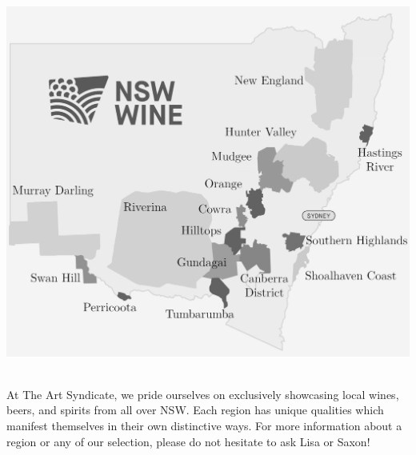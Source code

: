 \documentclass[
    pdflatex,
    fontsize=8pt,
    draft=true,
    twoside
]{article}
\begin{document}
\newpage
\begin{centering}
    \includegraphics[width=\textwidth]{Wine Map.png}
\end{centering}
\\
At The Art Syndicate, we pride ourselves on exclusively showcasing local wines, beers, and spirits from all over NSW. Each region has unique qualities which manifest themselves in their own distinctive ways. For more information about a region or any of our selection, please do not hesitate to ask Lisa or Saxon!

\newpage





\newpage


\newpage



\end{document}
